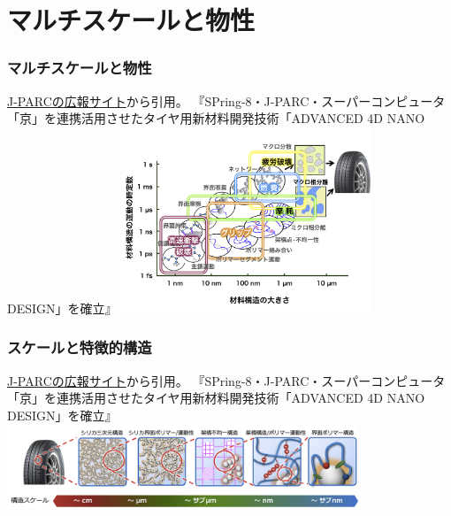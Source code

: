 \documentclass[11pt, dvipdfmx]{beamer}
\begin{document}
\section{マルチスケールと物性}
\begin{frame}
\frametitle{マルチスケールと物性}
\href{http://j-parc.jp/ja/topics/2015/Pulse151112.html}{J-PARCの広報サイト}から引用。
\small
『SPring-8・J-PARC・スーパーコンピュータ「京」を連携活用させたタイヤ用新材料開発技術「ADVANCED 4D NANO DESIGN」を確立』
\centering
\includegraphics[width=75mm]{./fig/press151112_02.jpg}
\end{frame}
\begin{frame}
\frametitle{スケールと特徴的構造}
\href{http://j-parc.jp/ja/topics/2015/Pulse151112.html}{J-PARCの広報サイト}から引用。
\small
『SPring-8・J-PARC・スーパーコンピュータ「京」を連携活用させたタイヤ用新材料開発技術「ADVANCED 4D NANO DESIGN」を確立』
\centering
\includegraphics[width=105mm]{./fig/press151112_03.jpg}
\end{frame}
\end{document}
